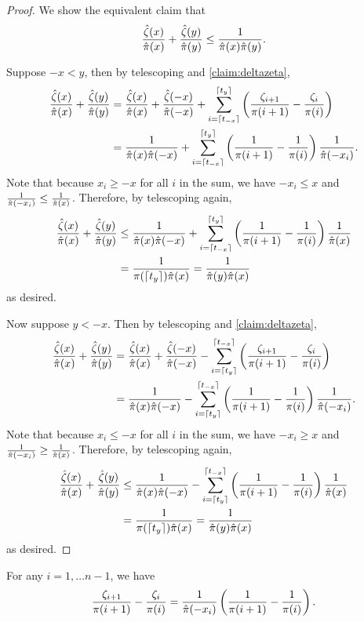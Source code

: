 \documentclass[main.tex]{subfiles}
\begin{document}
\begin{proof}
We show the equivalent claim that
\[
\frac{\hat{\zeta}(x)}{\hat{\pi}(x)}+\frac{\hat{\zeta}(y)}{\hat{\pi}(y)}\le\frac{1}{\hat{\pi}(x)\hat{\pi}(y)}.
\]

Suppose $-x<y$, then by telescoping and \cref{claim:deltazeta},
\begin{align*}
\frac{\hat{\zeta}(x)}{\hat{\pi}(x)}+\frac{\hat{\zeta}(y)}{\hat{\pi}(y)} & =\frac{\hat{\zeta}(x)}{\hat{\pi}(x)}+\frac{\hat{\zeta}(-x)}{\hat{\pi}(-x)}+\sum_{i=\lceil t_{-x}\rceil}^{\lceil t_{y}\rceil}\left(\frac{\zeta_{i+1}}{\pi(i+1)}-\frac{\zeta_{i}}{\pi(i)}\right)\\
 & =\frac{1}{\hat{\pi}(x)\hat{\pi}(-x)}+\sum_{i=\lceil t_{-x}\rceil}^{\lceil t_{y}\rceil}\left(\frac{1}{\pi(i+1)}-\frac{1}{\pi(i)}\right)\frac{1}{\hat{\pi}(-x_{i})}.
\end{align*}
Note that because $x_{i}\ge-x$ for all $i$ in the sum, we have $-x_{i}\le x$ and $\frac{1}{\hat{\pi}(-x_{i})}\le\frac{1}{\hat{\pi}(x)}$. Therefore, by telescoping again,
\begin{align*}
\frac{\hat{\zeta}(x)}{\hat{\pi}(x)}+\frac{\hat{\zeta}(y)}{\hat{\pi}(y)} & \le\frac{1}{\hat{\pi}(x)\hat{\pi}(-x)}+\sum_{i=\lceil t_{-x}\rceil}^{\lceil t_{y}\rceil}\left(\frac{1}{\pi(i+1)}-\frac{1}{\pi(i)}\right)\frac{1}{\hat{\pi}(x)}\\
 & =\frac{1}{\pi(\lceil t_{y}\rceil)\hat{\pi}(x)}=\frac{1}{\hat{\pi}(y)\hat{\pi}(x)}
\end{align*}
as desired. 

Now suppose $y<-x$. Then by telescoping and \cref{claim:deltazeta},
\begin{align*}
\frac{\hat{\zeta}(x)}{\hat{\pi}(x)}+\frac{\hat{\zeta}(y)}{\hat{\pi}(y)} & =\frac{\hat{\zeta}(x)}{\hat{\pi}(x)}+\frac{\hat{\zeta}(-x)}{\hat{\pi}(-x)}-\sum_{i=\lceil t_{y}\rceil}^{\lceil t_{-x}\rceil}\left(\frac{\zeta_{i+1}}{\pi(i+1)}-\frac{\zeta_{i}}{\pi(i)}\right)\\
 & =\frac{1}{\hat{\pi}(x)\hat{\pi}(-x)}-\sum_{i=\lceil t_{y}\rceil}^{\lceil t_{-x}\rceil}\left(\frac{1}{\pi(i+1)}-\frac{1}{\pi(i)}\right)\frac{1}{\hat{\pi}(-x_{i})}.
\end{align*}
Note that because $x_{i}\le-x$ for all $i$ in the sum, we have $-x_{i}\ge x$ and $\frac{1}{\hat{\pi}(-x_{i})}\ge\frac{1}{\hat{\pi}(x)}$. Therefore, by telescoping again,
\begin{align*}
\frac{\hat{\zeta}(x)}{\hat{\pi}(x)}+\frac{\hat{\zeta}(y)}{\hat{\pi}(y)} & \le\frac{1}{\hat{\pi}(x)\hat{\pi}(-x)}-\sum_{i=\lceil t_{y}\rceil}^{\lceil t_{-x}\rceil}\left(\frac{1}{\pi(i+1)}-\frac{1}{\pi(i)}\right)\frac{1}{\hat{\pi}(x)}\\
 & =\frac{1}{\pi(\lceil t_{y}\rceil)\hat{\pi}(x)}=\frac{1}{\hat{\pi}(y)\hat{\pi}(x)}
\end{align*}
as desired.
\end{proof}
\begin{claim}
\label{claim:deltazeta}For any $i=1,\ldots n-1$, we have
\[
\frac{\zeta_{i+1}}{\pi(i+1)}-\frac{\zeta_{i}}{\pi(i)}=\frac{1}{\hat{\pi}(-x_{i})}\left(\frac{1}{\pi(i+1)}-\frac{1}{\pi(i)}\right).
\]
\end{claim}
\end{document}
